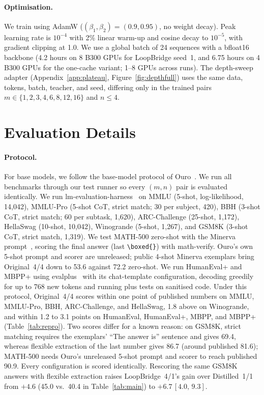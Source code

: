\documentclass[11pt]{article}
\newcommand{\ci}[2]{\,{\scriptsize\ensuremath{[#1,\,#2]}}}
\begin{document}
\paragraph{Optimisation.} We train using AdamW ($(\beta_1,\beta_2)=(0.9,0.95)$, no weight decay). Peak learning rate is
$10^{-4}$ with 2\% linear warm-up and cosine decay to $10^{-5}$, with gradient clipping at 1.0. We use a global batch of
24 sequences with a bfloat16 backbone (4.2 hours on 8 B300 GPUs for LoopBridge seed~1, and 6.75 hours on 4 B300 GPUs for
the one-cache variant; 1--8 GPUs across runs). The depth-sweep adapter (Appendix~\ref{app:plateau}, Figure~\ref{fig:depthfull}) uses the same data,
tokens, batch, teacher, and seed, differing only in the trained pairs $m\in\{1,2,3,4,6,8,12,16\}$ and $n\le4$.

\section{Evaluation Details}
\label{app:eval}

\paragraph{Protocol.} For base models, we follow the base-model protocol of Ouro~\citep[Appendix~C.1]{ouro}. We run all
benchmarks through our test runner so every $(m,n)$ pair is evaluated identically. We run
lm-evaluation-harness~\citep{lmeval} on MMLU (5-shot, log-likelihood, 14,042), MMLU-Pro (5-shot CoT, strict match; 30
per subject, 420), BBH (3-shot CoT, strict match; 60 per subtask, 1,620), ARC-Challenge (25-shot, 1,172), HellaSwag
(10-shot, 10,042), Winogrande (5-shot, 1,267), and GSM8K (3-shot CoT, strict match, 1,319). We test MATH-500 zero-shot
with the Minerva prompt~\citep{minerva}, scoring the final answer (last \verb|\boxed{}|) with math-verify. Ouro's own
5-shot prompt and scorer are unreleased; public 4-shot Minerva exemplars bring Original~4/4 down to 53.6 against 72.2
zero-shot. We run HumanEval+ and MBPP+ using evalplus~\citep{evalplus} with its chat-template configuration, decoding
greedily for up to 768 new tokens and running plus tests on sanitised code. Under this protocol, Original~4/4 scores
within one point of published numbers on MMLU, MMLU-Pro, BBH, ARC-Challenge, and HellaSwag, 1.8 above on Winogrande, and
within 1.2 to 3.1 points on HumanEval, HumanEval+, MBPP, and MBPP+ (Table~\ref{tab:repro}). Two scores differ for a
known reason: on GSM8K, strict matching requires the exemplars' ``The answer is'' sentence and gives 69.4, whereas
flexible extraction of the last number gives 86.7 (around published 81.6); MATH-500 needs Ouro's unreleased 5-shot
prompt and scorer to reach published 90.9. Every configuration is scored identically. Rescoring the same GSM8K answers
with flexible extraction raises LoopBridge~4/1's gain over Distilled~1/1 from $+4.6$ (45.0 vs.\ 40.4 in
Table~\ref{tab:main}) to $+6.7$\ci{4.0}{9.3}.
\end{document}
